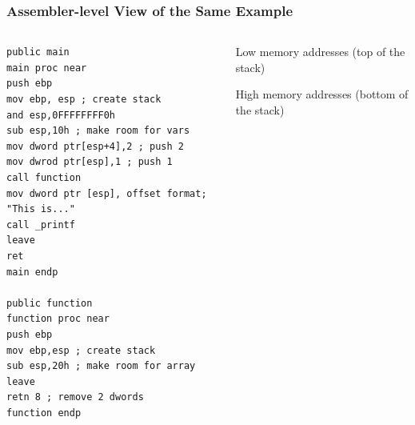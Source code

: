 \documentclass[]{beamer}
\begin{document}
\begin{frame}[fragile]
  \frametitle{Assembler-level View of the Same Example}
  \begin{columns}
    \begin{column}{.5\textwidth}

\begin{lstlisting}[language={[x86masm]Assembler},basicstyle=\tiny\ttfamily]
public main
main proc near
push ebp
mov ebp, esp ; create stack
and esp,0FFFFFFFF0h
sub esp,10h ; make room for vars
mov dword ptr[esp+4],2 ; push 2
mov dwrod ptr[esp],1 ; push 1
call function
mov dword ptr [esp], offset format; "This is..."
call _printf
leave
ret
main endp

public function
function proc near
push ebp
mov ebp,esp ; create stack
sub esp,20h ; make room for array
leave
retn 8 ; remove 2 dwords
function endp
\end{lstlisting}
    \end{column}

    \begin{column}{.5\textwidth}

      \begin{center}
        {\tiny Low memory addresses (top of the stack)}
        \begin{center}
        \end{center}
        {\tiny High memory addresses (bottom of the stack)}
      \end{center}
    \end{column}
  \end{columns}
  \begin{figure}
  \end{figure}
\end{frame}
\end{document}
